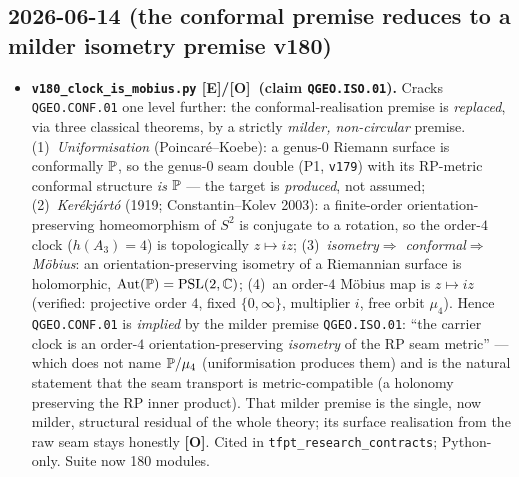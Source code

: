 \documentclass[11pt]{article}
\providecommand{\mE}{\textbf{[E]}}\providecommand{\mC}{\textbf{[C]}}
\providecommand{\mO}{\textbf{[O]}}\providecommand{\mX}{\textbf{[X]}}
\providecommand{\vref}[1]{\texttt{#1}}
\begin{document}
\subsection*{2026-06-14 (the conformal premise reduces to a milder isometry premise v180)}
\begin{itemize}
\item \textbf{\texttt{v180\_clock\_is\_mobius.py} \mE/\mO\ (claim \texttt{QGEO.ISO.01}).} Cracks
  \texttt{QGEO.CONF.01} one level further: the conformal-realisation premise is \emph{replaced}, via
  three classical theorems, by a strictly \emph{milder, non-circular} premise. (1)~\emph{Uniformisation}
  (Poincar\'e--Koebe): a genus-$0$ Riemann surface is conformally $\mathbb{P}$, so the genus-$0$ seam double
  (P1, \vref{v179}) with its RP-metric conformal structure \emph{is} $\mathbb{P}$ --- the target is
  \emph{produced}, not assumed; (2)~\emph{Ker\'ekj\'art\'o} (1919; Constantin--Kolev 2003): a
  finite-order orientation-preserving homeomorphism of $S^2$ is conjugate to a rotation, so the
  order-$4$ clock ($h(A_3){=}4$) is topologically $z\mapsto iz$; (3)~\emph{isometry$\Rightarrow$
  conformal$\Rightarrow$M\"obius}: an orientation-preserving isometry of a Riemannian surface is
  holomorphic, $\mathrm{Aut}(\mathbb{P})=\mathrm{PSL}(2,\mathbb C)$; (4)~an order-$4$ M\"obius map is
  $z\mapsto iz$ (verified: projective order $4$, fixed $\{0,\infty\}$, multiplier $i$, free orbit
  $\mu_4$). Hence \texttt{QGEO.CONF.01} is \emph{implied} by the milder premise \texttt{QGEO.ISO.01}:
  ``the carrier clock is an order-$4$ orientation-preserving \emph{isometry} of the RP seam metric'' ---
  which does not name $\mathbb{P}/\mu_4$ (uniformisation produces them) and is the natural statement that the
  seam transport is metric-compatible (a holonomy preserving the RP inner product). That milder premise
  is the single, now milder, structural residual of the whole theory; its surface realisation from the
  raw seam stays honestly \mO. Cited in \texttt{tfpt\_research\_contracts}; Python-only. Suite now 180
  modules.
\end{itemize}
\end{document}
